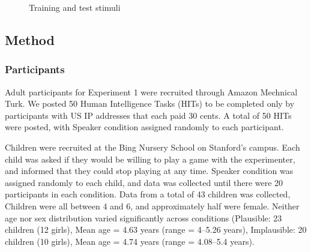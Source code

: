 \documentclass[man,floatsintext]{apa6}
\begin{document}
\begin{figure}[t]
     \begin{center}
    \end{center}
    \caption{Training and test stimuli
     }%
   \label{fig:stimuli}
\end{figure}


\subsection{Method}
\subsubsection{Participants}

Adult participants for Experiment 1 were recruited through Amazon Mechnical Turk. We posted 50 Human Intelligence Tasks (HITs) to be completed only by participants with US IP addresses that each paid 30 cents. A total of 50 HITs were posted, with Speaker condition assigned randomly to each participant.

Children were recruited at the Bing Nursery School on Stanford's campus. Each child was asked if they would be willing to play a game with the experimenter, and informed that they could stop playing at any time. Speaker condition was assigned randomly to each child, and data was collected until there were 20 participants in each condition. Data from a total of 43 children was collected, Children were all between 4 and 6, and approximately half were female. Neither age nor sex distribution varied significantly across conditions (Plausible: 23 children (12 girls), Mean age = 4.63 years (range = 4--5.26 years), Implausible: 20 children (10 girls), Mean age = 4.74 years (range = 4.08--5.4 years).
\end{document}
